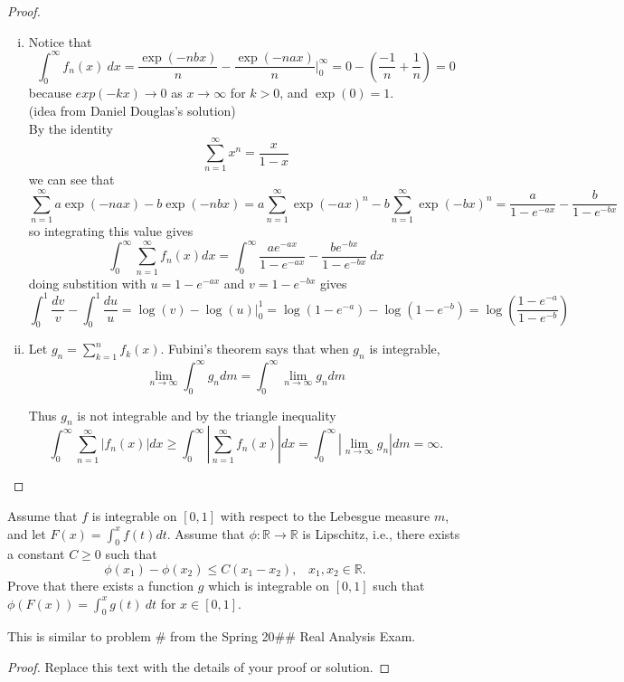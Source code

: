 \documentclass{article}
\newenvironment{problem}[2][Problem]{\begin{trivlist}
\item[\hskip \labelsep {\bfseries #1}\hskip \labelsep {\bfseries #2.}]}{\end{trivlist}}
\newenvironment{note}[1][Note.]{\begin{trivlist}
\item[\hskip \labelsep {\bfseries #1}]}{\end{trivlist}}
\begin{document}
\begin{proof}
  \begin{enumerate}[(i)]
      \item Notice that \[
          \int_0^\infty f_n(x)\ dx =
            \frac{\exp(-nbx)}{n} - \frac{\exp(-nax)}{n} \Big|_{0}^{\infty} =
            0 - \left(\frac{-1}{n} + \frac{1}{n}\right) =
            0
        \] because $exp(-kx) \rightarrow 0$ as $x \rightarrow \infty$ for
        $k > 0$, and $\exp(0) = 1$. \\

        (idea from Daniel Douglas's solution) \\
        By the identity \[
          \sum_{n = 1}^{\infty} x^n = \frac{x}{1 - x}
        \] we can see that \[
          \sum_{n = 1}^{\infty} a\exp(-nax) - b\exp(-nbx) =
          a\sum_{n = 1}^{\infty} \exp(-ax)^n - b\sum_{n = 1}^{\infty}\exp(-bx)^n =
          \frac{a}{1 - e^{-ax}} - \frac{b}{1 - e^{-bx}}
        \] so integrating this value gives \[
          \int_{0}^{\infty} \sum_{n = 1}^{\infty} f_n(x) dx =
          \int_{0}^{\infty} \frac{ae^{-ax}}{1 - e^{-ax}} - \frac{be^{-bx}}{1 - e^{-bx}}\ dx
        \] doing substition with $u = 1 - e^{-ax}$ and $v = 1 - e^{-bx}$ gives \[
          \int_{0}^{1} \frac{dv}{v} - \int_{0}^{1} \frac{du}{u} =
          \log(v) - \log(u) \Big|_0^1 =
          \log(1 - e^{-a}) - \log(1 - e^{-b}) =
          \log\left(\frac{1 - e^{-a}}{1 - e^{-b}}\right)
        \]

        \item Let $g_n = \sum_{k = 1}^{n} f_k(x)$. Fubini's theorem says that when $g_n$ is integrable, \[
          \lim_{n \rightarrow \infty} \int_0^\infty g_n dm =
          \int_0^\infty \lim_{n \rightarrow \infty} g_n dm
        \]

        Thus $g_n $ is not integrable and by the triangle inequality \[
          \int_{0}^{\infty} \sum_{n = 1}^{\infty} \left|f_n(x)\right| dx \geq
          \int_{0}^{\infty} \left|\sum_{n = 1}^{\infty} f_n(x)\right| dx =
          \int_{0}^{\infty} \left|\lim_{n \rightarrow \infty} g_n\right| dm =
          \infty.
        \]
    \end{enumerate}
\end{proof}

\pagebreak

\begin{problem}{4} Assume that $f$ is integrable on $[0, 1]$ with respect to the Lebesgue measure $m$, and let $F(x) = \int_{0}^{x}f(t) dt$. Assume that $\phi: \mathbb{R} \rightarrow \mathbb{R}$ is Lipschitz, i.e., there exists a constant $C \geq 0$ such that \[
  \phi(x_1) - \phi(x_2) \leq C(x_1 - x_2),
    \hspace{10pt} x_1, x_2 \in \mathbb{R}.
\]
Prove that there exists a function $g$ which is integrable on $[0, 1]$ such that $\phi(F(x)) = \int_{0}^{x} g(t) \ dt$ for $x \in [0, 1]$.
\end{problem}

\begin{note} This is similar to problem \# from the Spring 20\#\# Real Analysis Exam.
\end{note}

\begin{proof}
Replace this text with the details of your proof or solution.
\end{proof}
\end{document}
